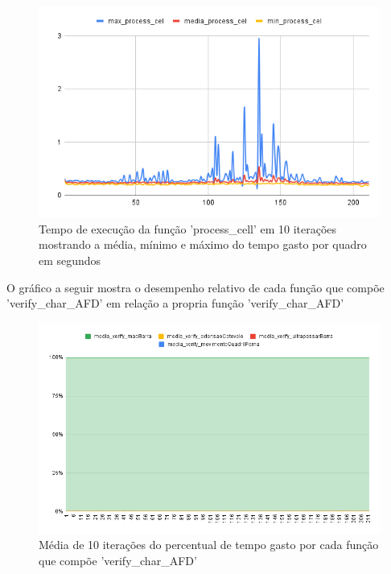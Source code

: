 \begin{figure}[H]
	\centering
	\caption{Tempo de execução da função 'process\_cell' em 10 iterações mostrando a média, mínimo e máximo do tempo gasto por quadro em segundos}
	\includegraphics[scale=0.8]{figuras/grafico/process_cell.png}
\end{figure}










\newpage

O gráfico a seguir mostra o desempenho relativo de cada função que compõe 'verify\_char\_AFD' em relação a propria função 'verify\_char\_AFD'

\begin{figure}[H]
	\centering
	\caption{ Média de 10 iterações do percentual de tempo gasto por cada função que compõe 'verify\_char\_AFD' }
	\includegraphics[scale=0.6]{figuras/grafico/comp_char_AFD.png}
\end{figure}




